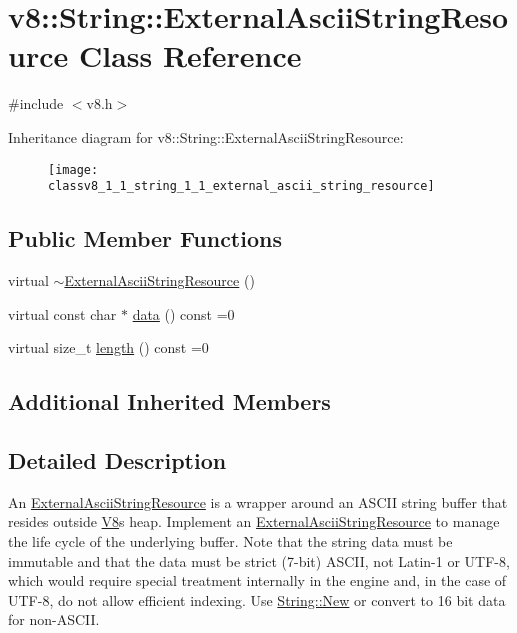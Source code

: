 \hypertarget{classv8_1_1_string_1_1_external_ascii_string_resource}{}\section{v8\+:\+:String\+:\+:External\+Ascii\+String\+Resource Class Reference}
\label{classv8_1_1_string_1_1_external_ascii_string_resource}


{\ttfamily \#include $<$v8.\+h$>$}

Inheritance diagram for v8\+:\+:String\+:\+:External\+Ascii\+String\+Resource\+:\begin{figure}[H]
\begin{center}
\leavevmode
\texttt{[image: classv8\_1\_1\_string\_1\_1\_external\_ascii\_string\_resource]}
\end{center}
\end{figure}
\subsection*{Public Member Functions}
\begin{DoxyCompactItemize}
\item 
virtual \hyperlink{classv8_1_1_string_1_1_external_ascii_string_resource_acd8790ae14be1b90794b363d24a147d0}{$\sim$\+External\+Ascii\+String\+Resource} ()
\item 
virtual const char $\ast$ \hyperlink{classv8_1_1_string_1_1_external_ascii_string_resource_adeb99e8c8c630e2dac5ad76476249d2f}{data} () const =0
\item 
virtual size\+\_\+t \hyperlink{classv8_1_1_string_1_1_external_ascii_string_resource_aeecccc52434c2057d3dc5c9732458a8e}{length} () const =0
\end{DoxyCompactItemize}
\subsection*{Additional Inherited Members}


\subsection{Detailed Description}
An \hyperlink{classv8_1_1_string_1_1_external_ascii_string_resource}{External\+Ascii\+String\+Resource} is a wrapper around an A\+S\+C\+I\+I string buffer that resides outside \hyperlink{classv8_1_1_v8}{V8}\textquotesingle{}s heap. Implement an \hyperlink{classv8_1_1_string_1_1_external_ascii_string_resource}{External\+Ascii\+String\+Resource} to manage the life cycle of the underlying buffer. Note that the string data must be immutable and that the data must be strict (7-\/bit) A\+S\+C\+I\+I, not Latin-\/1 or U\+T\+F-\/8, which would require special treatment internally in the engine and, in the case of U\+T\+F-\/8, do not allow efficient indexing. Use \hyperlink{classv8_1_1_string_a0b56fc1ad999590ce82f8348177ed725}{String\+::\+New} or convert to 16 bit data for non-\/\+A\+S\+C\+I\+I. 

